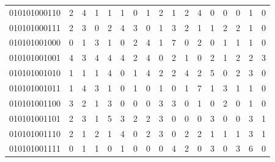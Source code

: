 \documentclass[10pt,a4paper]{article}
\begin{document}
\begin{longtable}{ |c|c|c|c|c|c|c|c|c|c|c|c|c|c|c|c|c| }
    010101000110              & 2                            & 4                                & 1                            & 1                              & 1   & 0   & 1   & 2   & 1   & 2   & 4   & 0   & 0   & 0   & 1   & 0   \\
    010101000111              & 2                            & 3                                & 0                            & 2                              & 4   & 3   & 0   & 1   & 3   & 2   & 1   & 1   & 2   & 2   & 1   & 0   \\
    010101001000              & 0                            & 1                                & 3                            & 1                              & 0   & 2   & 4   & 1   & 7   & 0   & 2   & 0   & 1   & 1   & 1   & 0   \\
    010101001001              & 4                            & 3                                & 4                            & 4                              & 4   & 2   & 4   & 0   & 2   & 1   & 0   & 2   & 1   & 2   & 2   & 3   \\
    010101001010              & 1                            & 1                                & 1                            & 4                              & 0   & 1   & 4   & 2   & 2   & 4   & 2   & 5   & 0   & 2   & 3   & 0   \\
    010101001011              & 1                            & 4                                & 3                            & 1                              & 0   & 1   & 0   & 1   & 0   & 1   & 7   & 1   & 3   & 1   & 1   & 0   \\
    010101001100              & 3                            & 2                                & 1                            & 3                              & 0   & 0   & 0   & 3   & 3   & 0   & 1   & 0   & 2   & 0   & 1   & 0   \\
    010101001101              & 2                            & 3                                & 1                            & 5                              & 3   & 2   & 2   & 3   & 0   & 0   & 0   & 3   & 0   & 0   & 3   & 1   \\
    010101001110              & 2                            & 1                                & 2                            & 1                              & 4   & 0   & 2   & 3   & 0   & 2   & 2   & 1   & 1   & 1   & 3   & 1   \\
    010101001111              & 0                            & 1                                & 1                            & 0                              & 1   & 0   & 0   & 0   & 4   & 2   & 0   & 3   & 0   & 3   & 6   & 0   \\

\end{longtable}
\end{document}

